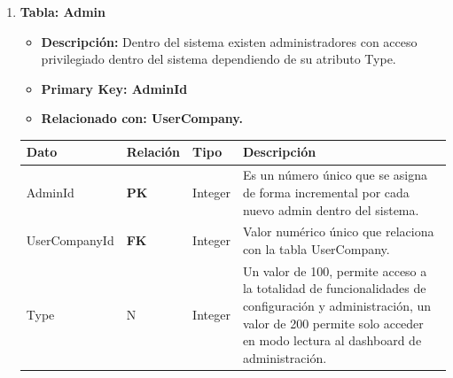 \documentclass[12pt]{article}
\begin{document}
\begin{enumerate}
    \newpage
    \item \textbf{Tabla: Admin}
    \begin{itemize}
        \item \textbf{Descripción:} Dentro del sistema existen administradores con acceso privilegiado dentro del sistema dependiendo de su atributo Type.
        \item \textbf{Primary Key: AdminId}
        \item \textbf{Relacionado con: UserCompany.}
    \end{itemize}
    \begin{table}[!h]
        \centering
        \begin{tabular}{|p{3cm}|p{2cm}|p{2.5cm}|p{8cm}|}
             \hline
             \textbf{Dato} & \textbf{Relación} & \textbf{Tipo} & \textbf{Descripción} \\
             \hline
             AdminId & \textbf{PK} & Integer & Es un número único que se asigna de forma incremental por cada nuevo admin dentro del sistema. \\
             \hline
             UserCompanyId & \textbf{FK} & Integer & Valor numérico único que relaciona con la tabla UserCompany.\\
             \hline
             Type & N & Integer & Un valor de 100, permite acceso a la totalidad de funcionalidades de configuración y administración, un valor de 200 permite solo acceder en modo lectura al dashboard de administración. \\
             \hline
        \end{tabular}
    \end{table}


\end{enumerate}
\end{document}
